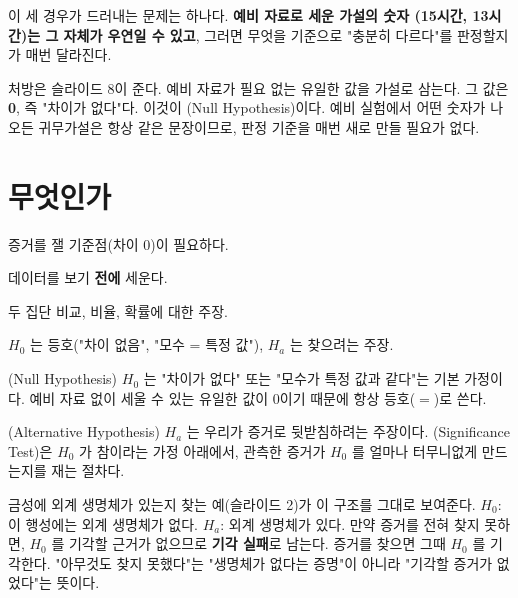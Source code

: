 이 세 경우가 드러내는 문제는 하나다. \textbf{예비 자료로 세운 가설의 숫자
(15시간, 13시간)는 그 자체가 우연일 수 있고}, 그러면 무엇을 기준으로
"충분히 다르다"를 판정할지가 매번 달라진다.

처방은 슬라이드 8이 준다. 예비 자료가 필요 없는 유일한 값을 가설로 삼는다.
그 값은 \textbf{0}, 즉 "차이가 없다"다. 이것이 (Null
Hypothesis)이다. 예비 실험에서 어떤 숫자가 나오든 귀무가설은 항상 같은
문장이므로, 판정 기준을 매번 새로 만들 필요가 없다.

\section{무엇인가}
\label{sec:ht-hypotheses}

\begin{inbrief}
  \item[Why] 증거를 잴 기준점(차이 0)이 필요하다.
  \item[When] 데이터를 보기 \textbf{전에} 세운다.
  \item[Where] 두 집단 비교, 비율, 확률에 대한 주장.
  \item[How] $H_0$ 는 등호("차이 없음", "모수 = 특정 값"), $H_a$ 는
             찾으려는 주장.
\end{inbrief}

\begin{definition}[귀무가설]
\label{def:ht-null}
(Null Hypothesis) $H_0$ 는 "차이가 없다" 또는 "모수가 특정
값과 같다"는 기본 가정이다. 예비 자료 없이 세울 수 있는 유일한 값이 0이기
때문에 항상 등호($=$)로 쓴다.
\end{definition}

\begin{definition}
\label{def:ht-alt}
(Alternative Hypothesis) $H_a$ 는 우리가 증거로 뒷받침하려는
주장이다. (Significance Test)은 $H_0$ 가 참이라는 가정
아래에서, 관측한 증거가 $H_0$ 를 얼마나 터무니없게 만드는지를 재는 절차다.
\end{definition}

금성에 외계 생명체가 있는지 찾는 예(슬라이드 2)가 이 구조를 그대로 보여준다.
$H_0$: 이 행성에는 외계 생명체가 없다. $H_a$: 외계 생명체가 있다. 만약
증거를 전혀 찾지 못하면, $H_0$ 를 기각할 근거가 없으므로 \textbf{기각 실패}로
남는다. 증거를 찾으면 그때 $H_0$ 를 기각한다. "아무것도 찾지 못했다"는
"생명체가 없다는 증명"이 아니라 "기각할 증거가 없었다"는 뜻이다.

